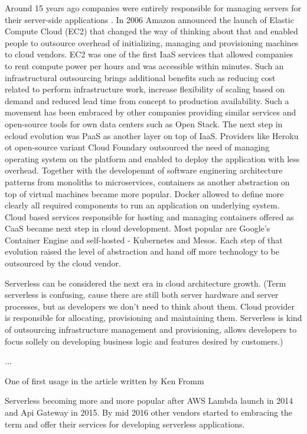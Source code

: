 Around 15 years ago companies were entirely responsible for managing servers for their server-side applications \cite{RobertsChapin2017}. In 2006 Amazon announced the launch of Elastic Compute Cloud (EC2) that changed the way of thinking about that and enabled people to outsource overhead of initializing, managing and provisioning machines to cloud vendors. EC2 was one of the first IaaS services that allowed companies to rent compute power per hours and was accessible within minutes. Such an infrastructural outsourcing brings additional benefits such as reducing cost related to perform infrastructure work, increase flexibility of scaling based on demand and reduced lead time from concept to production availability. Such a movement has been embraced by other companies providing similar services and open-source tools for own data centers such as Open Stack. The next step in ecloud evolution was PaaS as another layer on top of IaaS. Providers like Heroku ot open-source variant Cloud Foundary outsourced the need of managing operating system on the platform and enabled to deploy the application with less overhead. Together with the developemnt of software enginering architecture patterns from monoliths to microservices, containers as another abstraction on top of virtual machines became more popular. Docker allowed to define more clearly all required components to run an application on underlying system. Cloud based services responsible for hosting and managing containers offered as CaaS became next step in cloud development. Most popular are Google's Container Engine and self-hosted - Kubernetes and Mesos. 
Each step of that evolution raised the level of abstraction and hand off more technology to be outsourced by the cloud vendor.

Serverless can be considered the next era in cloud architecture growth. (Term serverless is confusing, cause there are still both server hardware and server processes, but as developers we don't need to think about them. Cloud provider is responsible for allocating, provisioning and maintaining them. Serverless is kind of outsourcing infrastructure management and provisioning, allows developers to focus sollely on developing business logic and features desired by customers.)

...

One of first usage in the article written by Ken Fromm

Serverless becoming more and more popular after AWS Lambda launch in 2014 and Api Gateway in 2015. By mid 2016 other vendors started to embracing the term and offer their services for developing serverless applications.

